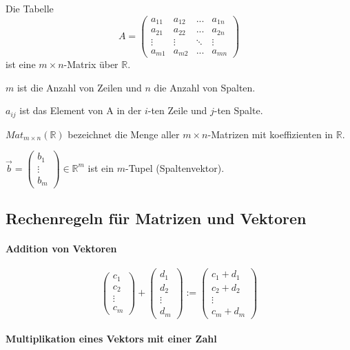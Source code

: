 \documentclass[a4paper,12pt]{article}
\begin{document}
Die Tabelle $$A=\begin{pmatrix}
    a_{11} & a_{12} & ...    & a_{1n} \\
    a_{21} & a_{22} & ...    & a_{2n} \\
    \vdots & \vdots & \ddots & \vdots \\
    a_{m1} & a_{m2} & ...    & a_{mn}
  \end{pmatrix}$$ ist eine $m\times n$-Matrix über $\mathbb{R}$.

$m$ ist die Anzahl von Zeilen und $n$ die Anzahl von Spalten.

$a_{ij}$ ist das Element von A in der $i$-ten Zeile und $j$-ten Spalte.

$Mat_{m\times n}(\mathbb{R})$ bezeichnet die Menge aller $m\times n$-Matrizen mit koeffizienten in $\mathbb{R}$.

$\vec{b}=\begin{pmatrix}
    b_1    \\
    \vdots \\
    b_m
  \end{pmatrix}\in\mathbb{R}^m$ ist ein $m$-Tupel (Spaltenvektor).

\subsection*{Rechenregeln für Matrizen und Vektoren}

\paragraph{Addition von Vektoren}

$$\begin{pmatrix}
    c_1 \\ c_2 \\ \vdots \\ c_m
  \end{pmatrix} + \begin{pmatrix}
    d_1 \\ d_2 \\ \vdots \\ d_m
  \end{pmatrix}:=\begin{pmatrix}
    c_1+d_1 \\ c_2+d_2 \\ \vdots \\ c_m+d_m
  \end{pmatrix}$$

\paragraph{Multiplikation eines Vektors mit einer Zahl}
\end{document}

